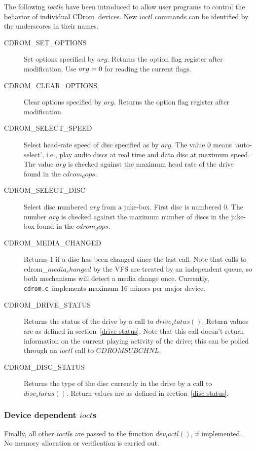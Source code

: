 \documentclass{article}
\def\cdrom{{\sc CDrom}}
\def\cdromc{{\tt cdrom.c}}
\begin{document}
The following $ioctl$s have been introduced to allow user programs to
control the behavior of individual \cdrom\ devices. New $ioctl$
commands can be identified by the underscores in their names.
\begin{description}
\item[CDROM_SET_OPTIONS] Set options specified by $arg$. Returns the
option flag register after modification. Use  $arg = \rm0$ for reading
the current flags.
\item[CDROM_CLEAR_OPTIONS] Clear options specified by $arg$. Returns
  the option flag register after modification.
\item[CDROM_SELECT_SPEED] Select head-rate speed of disc specified as
  by $arg$. The value 0 means `auto-select', i.e., play audio discs at
  real time and data disc at maximum speed. The value $arg$ is
  checked against the maximum head rate of the drive found in
  the $cdrom_dops$.
\item[CDROM_SELECT_DISC] Select disc numbered $arg$ from a juke-box.
  First disc is numbered 0. The number $arg$ is checked against the
  maximum number of discs in the juke-box found in the $cdrom_dops$.
\item[CDROM_MEDIA_CHANGED] Returns 1 if a disc has been changed since
  the last call. Note that calls to cdrom_$media_changed$ by the VFS
  are treated by an independent queue, so both mechanisms will detect
  a media change once. Currently, \cdromc\ implements maximum 16 minors
  per major device.
\item[CDROM_DRIVE_STATUS] Returns the status of the drive by a call to
  $drive_status()$. Return values are as defined in section~\ref{drive
    status}. Note that this call doesn't return information on the
  current playing activity of the drive; this can be polled through an
  $ioctl$ call to $CDROMSUBCHNL$.
\item[CDROM_DISC_STATUS] Returns the type of the disc currently in the
  drive by a call to $disc_status()$. Return values are as defined in
  section~\ref{disc status}.
\end{description}

\subsubsection{Device dependent $ioct$s}

Finally, all other $ioctl$s are passed to the function $dev_ioctl()$,
if implemented. No memory allocation or verification is carried out. 
\end{document}
